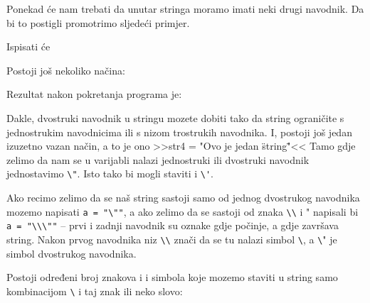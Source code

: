 	Ponekad će nam trebati da unutar stringa moramo imati neki drugi navodnik. Da
	bi to postigli promotrimo sljedeći primjer.
	

	Ispisati će


	Postoji još nekoliko načina:


	Rezultat nakon pokretanja programa je:


	Dakle, dvostruki navodnik u stringu mozete dobiti tako da string
	ograničite s jednostrukim navodnicima ili s nizom trostrukih navodnika. I,
	postoji još jedan izuzetno vazan način, a to je ono 
	>>str4 = "Ovo je jedan \"string\""<<
	Tamo gdje zelimo da nam se u varijabli nalazi jednostruki ili dvostruki
	navodnik jednostavimo \verb+\"+. Isto tako bi mogli staviti i \verb+\'+. 
	
	Ako recimo zelimo da se naš string sastoji samo od jednog dvostrukog
	navodnika mozemo napisati \verb+a = "\""+, a ako zelimo da se sastoji od
	znaka \verb+\\+ i " napisali bi \verb+a = "\\\""+ -- prvi i zadnji navodnik su oznake gdje
	počinje, a gdje završava string. Nakon prvog navodnika niz \verb+\\+ znači
	da se tu nalazi simbol \verb+\+, a \verb+\+" je simbol dvostrukog navodnika.
	
	Postoji
	određeni broj znakova i i simbola koje mozemo staviti u string samo
	kombinacijom \verb+\+ i taj znak ili neko slovo:

